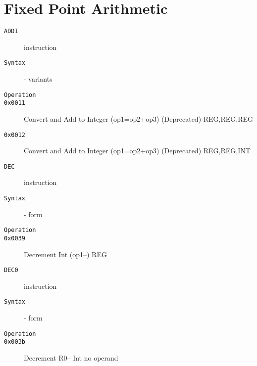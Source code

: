 \section{Fixed Point Arithmetic}
\begin{description}
\item[\texttt{ADDI}] instruction\\
\item[\texttt{Syntax}] - variants\\

\item[\texttt{Operation}]
\item[\texttt{}]
\item[\texttt{0x0011}] Convert and Add to Integer (op1=op2+op3) (Deprecated)  {REG,REG,REG}       \\
\item[\texttt{0x0012}] Convert and Add to Integer (op1=op2+op3) (Deprecated)  {REG,REG,INT}       \\
\end{description}
\clearpage
\begin{description}
\item[\texttt{DEC}] instruction\\
\item[\texttt{Syntax}] - form \\

\item[\texttt{Operation}]
\item[\texttt{}]
\item[\texttt{0x0039}] Decrement Int (op1--)  {REG}               \\
\end{description}
\clearpage
\begin{description}
\item[\texttt{DEC0}] instruction\\
\item[\texttt{Syntax}] - form \\

\item[\texttt{Operation}]
\item[\texttt{}]
\item[\texttt{0x003b}] Decrement R0-- Int  no operand          \\
\end{description}
